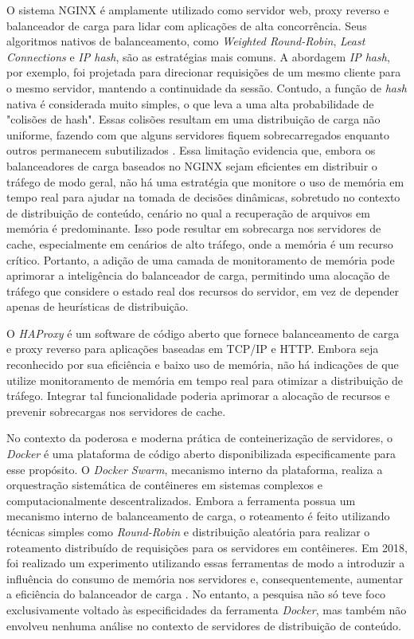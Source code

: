 O sistema NGINX é amplamente utilizado como servidor web, proxy reverso e balanceador de carga para lidar com aplicações de alta concorrência. Seus algoritmos nativos de balanceamento, como \textit{Weighted Round-Robin}, \textit{Least Connections} e \textit{IP hash}, são as estratégias mais comuns. A abordagem \textit{IP hash}, por exemplo, foi projetada para direcionar requisições de um mesmo cliente para o mesmo servidor, mantendo a continuidade da sessão.  Contudo, a função de \textit{hash} nativa é considerada muito simples, o que leva a uma alta probabilidade de "colisões de hash".  Essas colisões resultam em uma distribuição de carga não uniforme, fazendo com que alguns servidores fiquem sobrecarregados enquanto outros permanecem subutilizados \cite{nginxAlgorithmsEvaluationYuhong2022}. Essa limitação evidencia que, embora os balanceadores de carga baseados no NGINX sejam eficientes em distribuir o tráfego de modo geral, não há uma estratégia que monitore o uso de memória em tempo real para ajudar na tomada de decisões dinâmicas, sobretudo no contexto de distribuição de conteúdo, cenário no qual a recuperação de arquivos em memória é predominante. Isso pode resultar em sobrecarga nos servidores de cache, especialmente em cenários de alto tráfego, onde a memória é um recurso crítico. Portanto, a adição de uma camada de monitoramento de memória pode aprimorar a inteligência do balanceador de carga, permitindo uma alocação de tráfego que considere o estado real dos recursos do servidor, em vez de depender apenas de heurísticas de distribuição.

O \textit{HAProxy} \cite{haproxy} é um software de código aberto que fornece balanceamento de carga e proxy reverso para aplicações baseadas em TCP/IP e HTTP. Embora seja reconhecido por sua eficiência e baixo uso de memória, não há indicações de que utilize monitoramento de memória em tempo real para otimizar a distribuição de tráfego. Integrar tal funcionalidade poderia aprimorar a alocação de recursos e prevenir sobrecargas nos servidores de cache.

No contexto da poderosa e moderna prática de conteinerização de servidores, o \textit{Docker} é uma plataforma de código aberto disponibilizada especificamente para esse propósito. O \textit{Docker Swarm}, mecanismo interno da plataforma, realiza a orquestração sistemática de contêineres em sistemas complexos e computacionalmente descentralizados. Embora a ferramenta possua um mecanismo interno de balanceamento de carga, o roteamento é feito utilizando técnicas simples como \textit{Round-Robin} e distribuição aleatória para realizar o roteamento distribuído de requisições para os servidores em contêineres. Em 2018, foi realizado um experimento utilizando essas ferramentas de modo a introduzir a influência do consumo de memória nos servidores e, consequentemente, aumentar a eficiência do balanceador de carga \cite{dockerswarmmemory2018}. No entanto, a pesquisa não só teve foco exclusivamente voltado às especificidades da ferramenta \textit{Docker}, mas também não envolveu nenhuma análise no contexto de servidores de distribuição de conteúdo.

